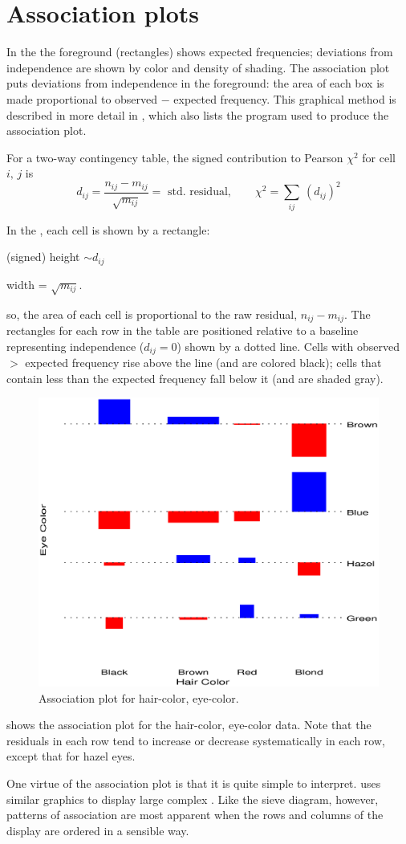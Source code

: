 \section{Association plots}\label{sec:twoway-assoc}
In the  the foreground (rectangles) shows expected
frequencies; deviations from independence are shown by color and
density of shading.  The association plot
\citep{Cohen:80,Friendly:91}
puts deviations from independence in the foreground:  the area
of each box is made proportional to observed $-$ expected frequency.
This graphical method is described in more detail in ,
which also lists the program used to produce the association plot.

For a two-way contingency table, the signed contribution to Pearson
\(\chi^2\) for cell \(i, \, j\) is
\begin{equation*}
  d_{ij}  =
  \frac{ n_{ij} - m_{ij} } { \sqrt { m_{ij} } }
 = \mbox{ std. residual},
  \qquad
  \chi^2 = \sum_{ij} \:  ( d_{ij} )^2
\end{equation*}

In the , each cell is shown by a
rectangle:

\begin{itemize*}
\item (signed) height \(\sim d_{ij}\)

\item width = \(\sqrt { m_{ij}}\).
\end{itemize*}
so, the area of each cell is proportional to the raw residual,
\(n_{ij} - m_{ij}\).
The rectangles for each row in the table are positioned relative to a
baseline representing independence (\(d_{ij} = 0\)) shown by a dotted
line.  Cells with observed \(>\) expected frequency rise above the line
(and are colored black); cells that contain less than the expected
frequency fall below it (and are shaded gray).

\begin{figure}[htb]
  \centering
  \includegraphics[width=.7\linewidth]{ch3/fig/assocplt.eps}
  \caption{Association plot for hair-color, eye-color.}\label{fig:assocplt}
\end{figure}
 shows the association plot for the hair-color,
eye-color data.  Note that the residuals in each row tend to increase
or decrease systematically in each row, except that for hazel eyes.

One virtue of the association plot is that it is quite simple to
interpret.  
\citet{Bertin:81} uses similar graphics to display large complex
\ctabs.  Like the sieve diagram, however, patterns of association
are most apparent when the rows and columns of the display are ordered
in a sensible way.

